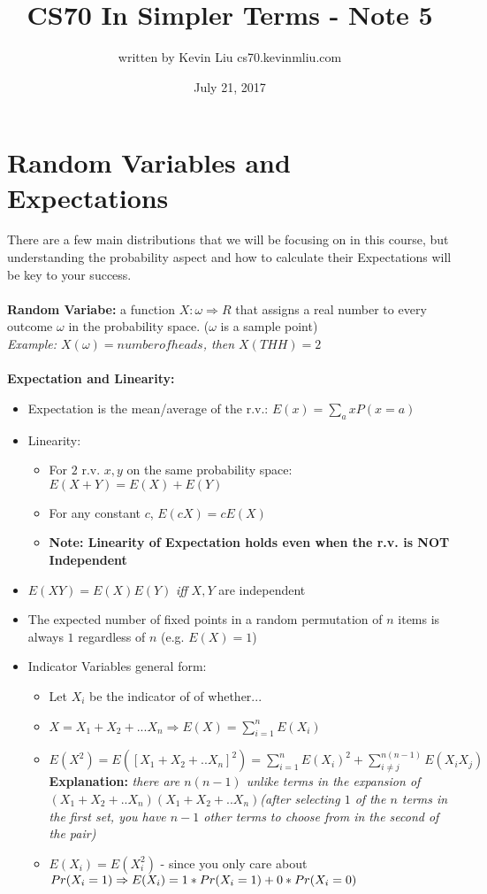\documentclass[a4paper]{article}
\title{CS70 In Simpler Terms - Note 5}
\author{written by Kevin Liu cs70.kevinmliu.com}
\date{July 21, 2017}
\begin{document}
\maketitle

\section{Random Variables and Expectations}
There are a few main distributions that we will be focusing on in this course, but understanding the probability aspect and how to calculate their Expectations will be key to your success.\\\\
\textbf{Random Variabe:} a function $X: \omega \Rightarrow R$ that assigns a real number to every outcome $\omega$ in the probability space. ($\omega$ is a sample point) \\
\indent \textit{Example: $X(\omega) = number of heads$, then $X(THH) = 2$}\\\\
\textbf{Expectation and Linearity:}
\begin{itemize}
    \item Expectation is the mean/average of the r.v.: $E(x)= \sum_a xP(x=a)$
    \item Linearity:
    \begin{itemize}
        \item For $2$ r.v. $x,y$ on the same probability space: $E(X+Y) = E(X) + E(Y)$
        \item For any constant $c$, $E(cX) = cE(X)$
        \item \textbf{Note: Linearity of Expectation holds even when the r.v. is NOT Independent}
    \end{itemize}
    \item $E(XY) = E(X)E(Y)$ \textit{iff} $X,Y$ are independent
    \item The expected number of fixed points in a random permutation of $n$ items is always $1$ regardless of $n$ (e.g. $E(X) = 1$)
    \item Indicator Variables general form:\\
    \begin{itemize}
        \item Let $X_i$ be the indicator of of whether...
        \item $X = X_1 + X_2 + ... X_n \Rightarrow E(X) = \sum_{i=1}^n E(X_i)$
        \item $E(X^2) = E([X_1 + X_2 + .. X_n]^2) = \sum_{i=1}^n E(X_i)^2 + \sum_{i\neq j}^{n(n-1)}E(X_i X_j)$ \textbf{Explanation:} \textit{there are $n(n-1)$ unlike terms in the expansion of $(X_1 + X_2 + .. X_n)(X_1 + X_2 + .. X_n)$(after selecting $1$ of the $n$ terms in the first set, you have $n-1$ other terms to choose from in the second of the pair)}
        \item $E(X_i) = E(X_i^2)$ - since you only care about $Pr(X_i=1) \Rightarrow \\E(X_i) = 1 * Pr(X_i = 1) + 0 * Pr(X_i = 0)$
        
    \end{itemize}

\end{itemize}
\end{document}
